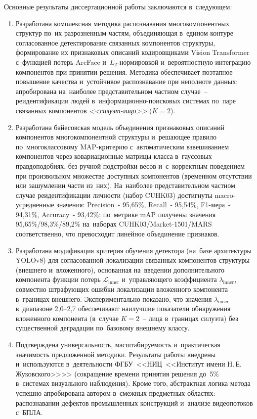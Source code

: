 Основные результаты диссертационной работы заключаются в~следующем:

\begin{enumerate}
    \item Разработана комплексная методика распознавания многокомпонентных
    структур по~их разрозненным частям, объединяющая в~едином контуре
    согласованное детектирование связанных компонентов структуры,
    формирование их признаковых описаний кодировщиками Vision Transformer
    с~функцией потерь ArcFace и~$L_2$-нормировкой и~вероятностную интеграцию
    компонентов при принятии решения. Методика обеспечивает поэтапное
    повышение качества и~устойчивое распознавание при неполноте данных;
    апробирована на~наиболее представительном частном случае~--
    реидентификации людей в~информационно-поисковых системах по~паре
    связанных компонентов \textit{<<силуэт-лицо>>} ($K=2$).

    \item Разработана байесовская модель объединения признаковых описаний
    компонентов многокомпонентной структуры и~решающее правило
    по~многоклассовому MAP-критерию с~автоматическим взвешиванием
    компонентов через ковариационные матрицы класса в~гауссовых
    правдоподобиях, без ручной подстройки весов и~с~корректным поведением
    при произвольном множестве доступных компонентов (временном отсутствии
    или зашумлении части из~них). На~наиболее представительном частном
    случае реидентификации личности (набор CUHK03) достигнуты
    macro-усредненные значения: Precision~- 95,65\%, Recall~- 95,54\%,
    F1-мера~- 94,31\%, Accuracy~- 93,42\%; по~метрике mAP получены значения
    95,65\%/98,3\%/89,2\% на~наборах CUHK03/Market-1501/MARS соответственно,
    что превосходит линейное объединение признаков.

    \item Разработана модификация критерия обучения детектора (на~базе
    архитектуры YOLOv8) для согласованной локализации связанных компонентов
    структуры (внешнего и~вложенного), основанная на~введении дополнительного
    компонента функции потерь $\mathcal{L}_{\text{inner}}$ и~управляющего
    коэффициента $\lambda_{\text{inner}}$, совместно штрафующих ошибки
    локализации вложенного компонента в~границах внешнего. Экспериментально
    показано, что значения $\lambda_{\text{inner}}$ в~диапазоне 2,0--2,7
    обеспечивают наилучшие показатели обнаружения вложенного компонента
    (в~случае $K=2$~-- лица в~границах силуэта) без существенной деградации
    по~базовому внешнему классу.

    \item Подтверждена универсальность, масштабируемость и~практическая
    значимость предложенной методики. Результаты работы внедрены и~используются
    в~деятельности ФГБУ~<<НИЦ~<<Институт имени Н.\,Е.\,Жуковского>>>>
    (сокращение времени принятия решения до~5\% в~системах визуального
    наблюдения). Кроме того, абстрактная логика метода успешно апробирована
    автором в~смежных предметных областях: распознавании дефектов промышленных
    конструкций и~анализе видеопотоков с~БПЛА.
\end{enumerate}

